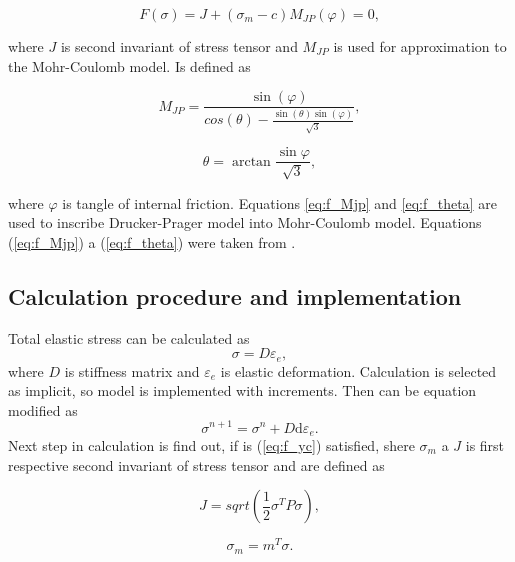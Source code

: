 \begin{equation}\label{eq:f_yc}
	F(\sigma) = J + (\sigma_m-c)M_{JP}(\varphi) = 0,
\end{equation}

where $J$ is second invariant of stress tensor and $M_{JP}$ is used for approximation to the Mohr-Coulomb model. Is defined as

\begin{equation}\label{eq:f_Mjp}
	M_{JP} = \dfrac{\sin(\varphi)}{cos(\theta)-\frac{\sin(\theta)\sin(\varphi)}{\sqrt{3}}},
\end{equation}

\begin{equation}\label{eq:f_theta}
	\theta = \arctan{\frac{\sin{\varphi}}{\sqrt{3}}},
\end{equation}

where $\varphi$ is tangle of internal friction. Equations \ref{eq:f_Mjp} and \ref{eq:f_theta} are used to inscribe Drucker-Prager model into Mohr-Coulomb model.
Equations (\ref{eq:f_Mjp}) a (\ref{eq:f_theta}) were taken from \cite{drucker}.

\subsection{Calculation procedure and implementation}\label{sec:drucker-prager_count}
\indent

Total elastic stress can be calculated as 
\begin{equation}\label{eq:f_sigma}
	\sigma = D \varepsilon_e,
\end{equation}
where $D$ is stiffness matrix and $\varepsilon_e$ is elastic deformation. Calculation is selected as implicit, so model is implemented with increments. Then can be equation modified as
\begin{equation}\label{eq:f_sigma1}
	\sigma^{n+1} = \sigma^n+ D \mathrm{d} \varepsilon_e.
\end{equation}
Next step in calculation is find out, if is (\ref{eq:f_yc}) satisfied, shere $\sigma_m$ a $J$ is first respective second invariant of stress tensor and are defined as

\begin{equation}\label{eq:f_J}
	J = sqrt(\frac{1}{2}\sigma^TP\sigma),
\end{equation}

\begin{equation}\label{eq:f_sigM}
	\sigma_m = m^T\sigma.
\end{equation}

